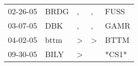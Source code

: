 \begin{supertabular}{p{0.07\textwidth}p{0.06\textwidth}p{0.02\textwidth}p{0.02\textwidth}p{0.06\textwidth}}
 02-26-05\textsuperscript{} &  BRDG\textsuperscript{} &             , &             , &  FUSS\textsuperscript{} \\
 03-07-05\textsuperscript{} &   DBK\textsuperscript{} &             , &             , &  GAMR\textsuperscript{} \\
 04-02-05\textsuperscript{} &  bttm\textsuperscript{} &  \textgreater &  \textgreater &  BTTM\textsuperscript{} \\
 09-30-05\textsuperscript{} &  BILY\textsuperscript{} &  \textgreater &               &                   *CS1* \\
\end{supertabular}
